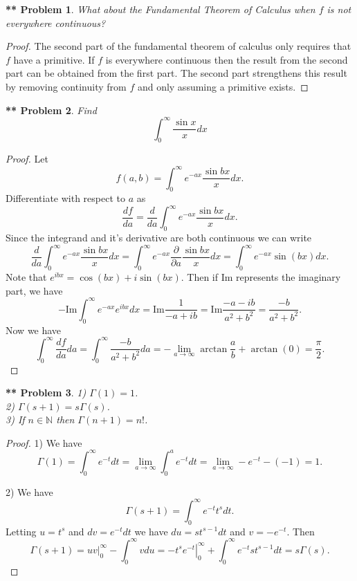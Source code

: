 \documentclass{article}
\newtheorem{**}{** Problem}
\newcommand{\im}{\text{Im}}
\begin{document}
\begin{flushleft}
\begin{**}
What about the Fundamental Theorem of Calculus when $f$ is not everywhere continuous?
\end{**}
\begin{proof}
The second part of the fundamental theorem of calculus only requires that $f$ have a primitive. If $f$ is everywhere continuous then the result from the second part can be obtained from the first part. The second part strengthens this result by removing continuity from $f$ and only assuming a primitive exists.
\end{proof}

\begin{**}
Find
\[
\int_0^{\infty} \frac{\sin x}{x} dx
\]
\end{**}
\begin{proof}
Let
\[
f(a,b) = \int_0^{\infty} e^{-ax} \frac{\sin b x}{x} dx.
\]
Differentiate with respect to $a$ as
\[
\frac{df}{da} = \frac{d}{da} \int_0^{\infty} e^{-ax} \frac{\sin b x}{x} dx.
\]
Since the integrand and it's derivative are both continuous we can write
\[
\frac{d}{da} \int_0^{\infty} e^{-ax} \frac{\sin b x}{x} dx = \int_0^{\infty} e^{-ax} \frac{\partial}{\partial a} \frac{\sin b x}{x} dx = \int_0^{\infty} e^{-ax} \sin (bx) dx.
\]
Note that $e^{ibx} = \cos(bx) + i \sin(bx)$. Then if $\im$ represents the imaginary part, we have
\[
-\im \int_0^{\infty} e^{-ax} e^{ibx} dx = \im \frac{1}{-a+ib} = \im \frac{-a-ib}{a^2+b^2} = \frac{-b}{a^2+b^2}.
\]
Now we have
\[
\int_0^{\infty} \frac{df}{da} da = \int_0^{\infty} \frac{-b}{a^2+b^2}da = -\lim_{a \rightarrow \infty} \arctan \frac{a}{b} + \arctan (0) = \frac{\pi}{2}.
\]
\end{proof}

\begin{**}
1) $\Gamma(1) = 1$.\\
2) $\Gamma(s+1) = s \Gamma(s)$.\\
3) If $n \in \mathbb{N}$ then $\Gamma(n+1) = n!$.
\end{**}
\begin{proof}
1) We have
\[
\Gamma(1) = \int_0^{\infty} e^{-t} dt = \lim_{a \rightarrow \infty} \int_0^a e^{-t} dt = \lim_{a \rightarrow \infty} -e^{-t} - (-1) = 1.
\]\newline

2) We have
\[
\Gamma(s+1) = \int_0^{\infty} e^{-t} t^{s} dt.
\]
Letting $u = t^s$ and $dv = e^{-t} dt$ we have $du = s t^{s-1} dt$ and $v = -e^{-t}$. Then
\[
\Gamma(s+1) = \left. uv \right |_{0}^{\infty} - \int_{0}^{\infty} v du = \left. -t^s e^{-t} \right |_{0}^{\infty} + \int_{0}^{\infty} e^{-t} s t^{s-1} dt = s \Gamma(s).
\]\newline


\end{proof}
\end{flushleft}
\end{document}
